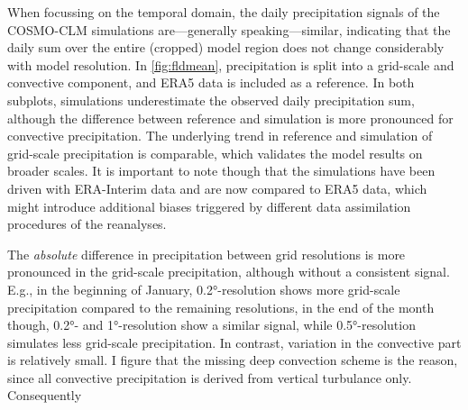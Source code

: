 When focussing on the temporal domain, the daily precipitation signals of the COSMO-CLM simulations are---generally speaking---similar, indicating that the daily sum over the entire (cropped) model region does not change considerably with model resolution. In \cref{fig:fldmean}, precipitation is split into a grid-scale and convective component, and ERA5 data is included as a reference.
In both subplots, simulations underestimate the observed daily precipitation sum, although the difference between reference and simulation is more pronounced for convective precipitation. The underlying trend in reference and simulation of grid-scale precipitation is comparable, which validates the model results on broader scales. It is important to note though that the simulations have been driven with ERA-Interim data and are now compared to ERA5 data, which might introduce additional biases triggered by different data assimilation procedures of the reanalyses.

The \textit{absolute} difference in precipitation between grid resolutions is more pronounced in the grid-scale precipitation, although without a consistent signal. E.g., in the beginning of January, 0.2°-resolution shows more grid-scale precipitation compared to the remaining resolutions, in the end of the month though, 0.2°- and 1°-resolution show a similar signal, while 0.5°-resolution simulates less grid-scale precipitation. In contrast, variation in the convective part is relatively small. I figure that the missing deep convection scheme is the reason, since all convective precipitation is derived from vertical turbulance only. Consequently